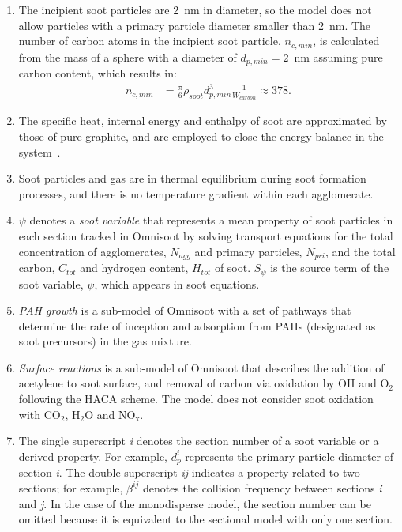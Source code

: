 \begin{enumerate}
\item The incipient soot particles are 2~nm in diameter, so the model does not allow particles with a primary particle diameter smaller than 2~nm. The number of carbon atoms in the incipient soot particle, $n_{c,min}$, is calculated from the mass of a sphere with a diameter of $d_{p,min}=2$~nm assuming pure carbon content, which results in:
\begin{equation}
	\begin{split}
	n_{c,min}& =\frac{\pi}{6}\rho_{soot}d^3_{p,min}\frac{1}{W_{carbon}}\approx378.
	\label{eqn:nc_min}
	\end{split}
\end{equation}


\item The specific heat, internal energy and enthalpy of soot are approximated by those of pure graphite, and are employed to close the energy balance in the system~\cite{mcbride1993coefficients}.

\item Soot particles and gas are in thermal equilibrium during soot formation processes, and there is no temperature gradient within each agglomerate.


\item $\psi$ denotes a \textit{soot variable} that represents a mean property of soot particles in each section tracked in Omnisoot by solving transport equations for the total concentration of agglomerates, $N_{agg}$ and primary particles, $N_{pri}$, and the total carbon, $C_{tot}$ and hydrogen content, $H_{tot}$ of soot. $S_{\psi}$ is the source term of the soot variable, $\psi$, which appears in soot equations.  

\item \textit{PAH growth} is a sub-model of Omnisoot with a set of pathways that determine the rate of inception and adsorption from PAHs (designated as soot precursors) in the gas mixture.

\item \textit{Surface reactions} is a sub-model of Omnisoot that describes the addition of acetylene to soot surface, and removal of carbon via oxidation by OH and $\mathrm{O_2}$ following the HACA scheme. The model does not consider soot oxidation with $\mathrm{CO_2}$, $\mathrm{H_2O}$ and $\mathrm{NO_x}$.

\item The single superscript \textit{i} denotes the section number of a soot variable or a derived property. For example, $d^i_p$ represents the primary particle diameter of section \textit{i}. The double superscript \textit{ij} indicates a property related to two sections; for example, $\beta^{ij}$ denotes the collision frequency between sections \textit{i} and \textit{j}. In the case of the monodisperse model, the section number can be omitted because it is equivalent to the sectional model with only one section.



\end{enumerate}
